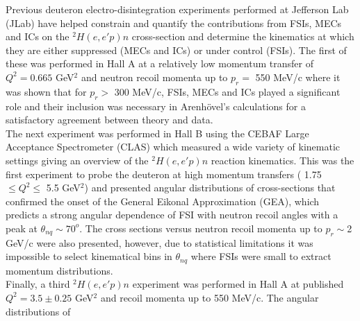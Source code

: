 \indent Previous deuteron electro-disintegration experiments performed at Jefferson Lab (JLab) have helped constrain and quantify the contributions from FSIs, MECs and ICs on
the $^{2}H(e,e'p)n$ cross-section and determine the kinematics at which they are either suppressed (MECs and ICs) or under control (FSIs). The first of these was performed in Hall A \cite{PhysRevLett.89.062301}
at a relatively low momentum transfer of $Q^{2}=0.665$ GeV$^{2}$ and neutron recoil momenta
up to $p_{r} = $ 550 MeV/c where it was shown that for $p_{r}>$ 300 MeV/c, FSIs, MECs and ICs played a significant role and their inclusion was necessary in Arenh\"{o}vel's calculations \cite{PhysRevC.43.1022, PhysRevC.46.455, PhysRevC.52.1232, PhysRevC.55.2214}
for a satisfactory agreement between theory and data. \\
\indent The next experiment was performed in Hall B \cite{PhysRevLett.98.262502} using the CEBAF Large Acceptance Spectrometer (CLAS) which measured a wide variety of kinematic settings
giving an overview of the $^{2}H(e,e'p)n$ reaction kinematics. This was the first experiment to probe
the deuteron at high momentum transfers ( 1.75 $\leq Q^{2}\leq$ 5.5 GeV$^{2}$) and presented angular distributions of cross-sections that confirmed the onset of
the General Eikonal Approximation (GEA)\cite{sargsian_2001,PhysRevC.56.1124}, which predicts a strong angular dependence of FSI with neutron recoil angles with a peak at $\theta_{nq} \sim 70^{o}$.
The cross sections versus neutron recoil momenta up to $p_{r}\sim$2 GeV/c were also presented, however, due to statistical limitations it was impossible to select kinematical bins in $\theta_{nq}$ where
FSIs were small to extract momentum distributions.\\
\indent Finally, a third $^{2}H(e,e'p)n$ experiment was performed in Hall A \cite{PhysRevLett.107.262501} at published $Q^{2} = 3.5\pm0.25$ GeV$^{2}$ and recoil momenta up to 550 MeV/c. The angular distributions of
